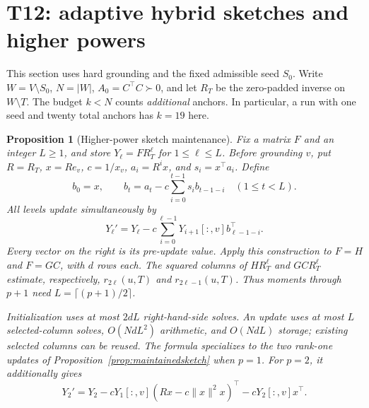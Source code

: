 \documentclass[11pt]{article}
\newtheorem{proposition}[theorem]{Proposition}
\begin{document}
\section{T12: adaptive hybrid sketches and higher powers}

This section uses hard grounding and the fixed admissible seed
$S_0$. Write $W=V\setminus S_0$, $N=|W|$,
$A_0=C^\top C\succ0$, and let $R_T$ be the zero-padded inverse
on $W\setminus T$. The budget $k<N$ counts \emph{additional}
anchors. In particular, a run with one seed and twenty total
anchors has $k=19$ here.

\begin{proposition}[Higher-power sketch maintenance]
\label{prop:highermaintained}
Fix a matrix $F$ and an integer $L\geq1$, and store
$Y_\ell=FR_T^\ell$ for $1\leq\ell\leq L$.
Before grounding $v$, put $R=R_T$, $x=Re_v$, $c=1/x_v$,
$a_i=R^ix$, and $s_i=x^\top a_i$. Define
\[
 b_0=x,\qquad
 b_t=a_t-c\sum_{i=0}^{t-1}s_i b_{t-1-i}
 \quad(1\leq t<L).
\]
All levels update simultaneously by
\begin{equation}\label{eq:highermaintained}
 Y_\ell'=Y_\ell-c\sum_{i=0}^{\ell-1}
             Y_{i+1}[:,v]b_{\ell-1-i}^\top.
\end{equation}
Every vector on the right is its pre-update value.
Apply this construction to $F=H$ and $F=GC$, with $d$ rows each.
The squared columns of $HR_T^\ell$ and $GCR_T^\ell$ estimate,
respectively, $r_{2\ell}(u,T)$ and $r_{2\ell-1}(u,T)$.
Thus moments through $p+1$ need $L=\lceil(p+1)/2\rceil$.

Initialization uses at most $2dL$ right-hand-side solves.
An update uses at most $L$ selected-column solves,
$O(NdL^2)$ arithmetic, and $O(NdL)$ storage; existing selected
columns can be reused. The formula specializes to the two
rank-one updates of Proposition~\ref{prop:maintainedsketch}
when $p=1$. For $p=2$, it additionally gives
\[
 Y_2'=Y_2-cY_1[:,v](Rx-c\|x\|^2x)^\top
                 -cY_2[:,v]x^\top.
\]
\end{proposition}
\end{document}
